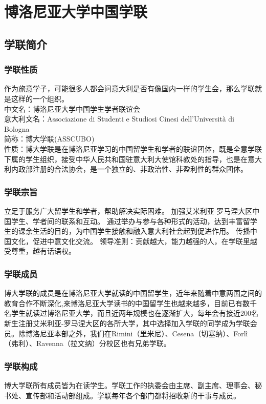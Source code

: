 \chapter{博洛尼亚大学中国学联}              

\section{学联简介}

\subsection{学联性质}
作为旅意学子，可能很多人都会问意大利是否有像国内一样的学生会，那么学联就是这样的一个组织。\\
中文名：博洛尼亚大学中国学生学者联谊会\\
意大利文名：Associazione di Studenti e Studiosi Cinesi dell'Università di Bologna\\
简称：博大学联(ASSCUBO)\\
性质：博大学联是在博洛尼亚学习的中国留学生和学者的联谊团体，既是全意学联下属的学生组织，接受中华人民共和国驻意大利大使馆科教处的指导，也是在意大利内政部注册的合法协会，是一个独立的、非政治性、非盈利性的群众团体。 

\subsection{学联宗旨}
立足于服务广大留学生和学者，帮助解决实际困难。
加强艾米利亚-罗马涅大区中国学生、学者间的联系和互动。 
通过举办与参与各种形式的活动，达到丰富留学生的课余生活的目的，为中国学生接触和融入意大利社会起到促进作用。 
传播中国文化，促进中意文化交流。 领导准则：贡献越大，能力越强的人，在学联里越受尊重，越有话语权。

\subsection{学联成员}
博大学联的成员是在博洛尼亚大学就读的中国留学生，近年来随着中意两国之间的教育合作不断深化,来博洛尼亚大学读书的中国留学生也越来越多，目前已有数千名学生就读过博洛尼亚大学，而且近两年规模也在逐渐扩大，每年会有接近200名新生注册艾米利亚-罗马涅大区的各所大学，其中选择加入学联的同学成为学联会员。除博洛尼亚本部之外，我们在Rimini（里米尼）、Cesena（切塞纳）、Forlì（弗利）、Ravenna（拉文纳）分校区也有兄弟学联。 

\subsection{学联构成}
博大学联所有成员皆为在读学生。学联工作的执委会由主席、副主席、理事会、秘书处、宣传部和活动部组成。学联每年各个部门都将招收新的干事与成员。

